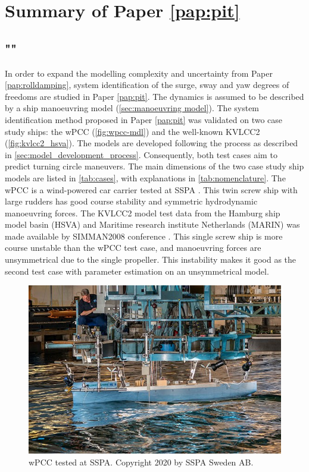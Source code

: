 \section{Summary of Paper \ref{pap:pit}}
\subsection*{""}
In order to expand the modelling complexity and uncertainty from Paper \ref{pap:rolldamping}, system identification of the surge, sway and yaw
degrees of freedoms are studied in Paper \ref{pap:pit}. The dynamics is assumed to be described by a ship manoeuvring model (\autoref{sec:manoeuvring model}). The system identification method proposed in Paper \ref{pap:pit} was validated on two case study ships: the wPCC (\autoref{fig:wpcc-mdl}) and the well-known KVLCC2 (\autoref{fig:kvlcc2_hsva}). The models are developed following the process as described in \autoref{sec:model_development_process}. Consequently, both test cases aim to predict turning circle maneuvers. The main dimensions of the two case study ship models are listed in \autoref{tab:cases}, with explanations in \autoref{tab:nomenclature}. The wPCC is a wind-powered car carrier tested at SSPA \cite{alexandersson_wpcc_2022}. This twin screw ship with large rudders has good course stability and symmetric hydrodynamic manoeuvring forces. The KVLCC2 model test data from the Hamburg ship model basin (HSVA) and Maritime research institute Netherlands (MARIN) was made available by SIMMAN2008 conference \cite{stern_experience_2011}. This single screw ship is more course unstable than the wPCC test case, and manoeuvring forces are unsymmetrical due to the single propeller. This instability makes it good as the second test case with parameter estimation on an unsymmetrical model.

\begin{figure}[!htb]
\centering
\includegraphics[width=\linewidth]{kappa/images/wpcc_mdl.png}
\caption{wPCC tested at SSPA. Copyright 2020 by SSPA Sweden AB.}
\label{fig:wpcc-mdl}
\end{figure}

